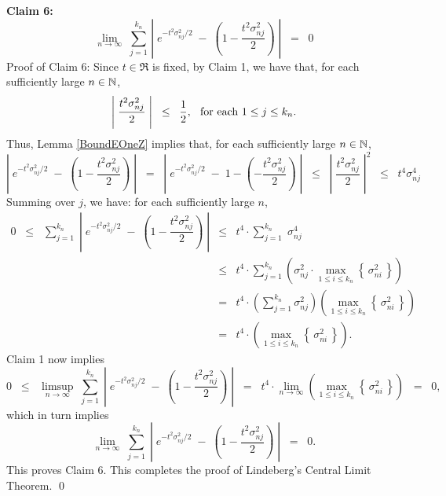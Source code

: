 \vskip 0.5cm
\noindent
\textbf{Claim 6:}
\begin{equation*}
\lim_{n\rightarrow\infty}\;
\sum_{j=1}^{k_{n}}\,
\left\vert\; e^{-t^{2}\sigma^{2}_{nj}/2} \; - \; \left(1 - \dfrac{t^{2}\sigma^{2}_{nj}}{2}\right)\;\right\vert
\;\;=\;\; 0
\end{equation*}
{\small Proof of Claim 6:
Since $t \in \Re$ is fixed, by Claim 1, we have that, for each sufficiently large $n \in \mathbb{N}$,
\begin{equation*}
\left\vert\;\dfrac{t^{2}\sigma^{2}_{nj}}{2}\;\right\vert \;\; \leq \;\; \dfrac{1}{2},
\;\;\,
\textnormal{for each $1 \leq j \leq k_{n}$}.
\end{equation*}
Thus, Lemma \ref{BoundEOneZ} implies that, for each sufficiently large $n \in \mathbb{N}$,
\begin{equation*}
\left\vert\; e^{-t^{2}\sigma^{2}_{nj}/2} \; - \; \left(1 - \dfrac{t^{2}\sigma^{2}_{nj}}{2}\right)\;\right\vert
\;\; = \;\; \left\vert\; e^{-t^{2}\sigma^{2}_{nj}/2} \; - \; 1 - \left( - \dfrac{t^{2}\sigma^{2}_{nj}}{2}\right)\;\right\vert
\;\; \leq \;\; \left\vert\; \dfrac{t^{2}\sigma^{2}_{nj}}{2} \;\right\vert^{2}
\;\; \leq \;\; t^{4}\sigma^{4}_{nj}
\end{equation*}
Summing over $j$, we have: for each sufficiently large $n$,
\begin{eqnarray*}
0 \;\; \leq \;\;
\sum_{j=1}^{k_{n}}\;\left\vert\; e^{-t^{2}\sigma^{2}_{nj}/2} \; - \; \left(1 - \dfrac{t^{2}\sigma^{2}_{nj}}{2}\right)\;\right\vert
&\leq& t^{4}\cdot\sum_{j=1}^{k_{n}}\;\sigma^{4}_{nj}
\\
&\leq& t^{4}\cdot\sum_{j=1}^{k_{n}}\left(\sigma^{2}_{nj}\cdot\max_{1\leq i \leq k_{n}}\left\{\,\sigma^{2}_{ni}\,\right\}\right)
\\
&=& t^{4}\cdot\left(\sum_{j=1}^{k_{n}}\sigma^{2}_{nj}\right)\left(\max_{1\leq i \leq k_{n}}\left\{\,\sigma^{2}_{ni}\,\right\}\right)
\\
&=& t^{4}\cdot\left(\max_{1\leq i \leq k_{n}}\left\{\,\sigma^{2}_{ni}\,\right\}\right).
\end{eqnarray*}
Claim 1 now implies
\begin{equation*}
0 \;\; \leq \;\;
\limsup_{n\rightarrow\infty}\;
\sum_{j=1}^{k_{n}}\;\left\vert\; e^{-t^{2}\sigma^{2}_{nj}/2} \; - \; \left(1 - \dfrac{t^{2}\sigma^{2}_{nj}}{2}\right)\;\right\vert
\;\;=\;\; t^{4}\cdot\lim_{n\rightarrow\infty}\left(\max_{1\leq i \leq k_{n}}\left\{\,\sigma^{2}_{ni}\,\right\}\right)
\;\; = \;\; 0,
\end{equation*}
which in turn implies
\begin{equation*}
\lim_{n\rightarrow\infty}\;
\sum_{j=1}^{k_{n}}\;\left\vert\; e^{-t^{2}\sigma^{2}_{nj}/2} \; - \; \left(1 - \dfrac{t^{2}\sigma^{2}_{nj}}{2}\right)\;\right\vert
\;\; = \;\; 0.
\end{equation*}
This proves Claim 6.
}
This completes the proof of Lindeberg's Central Limit Theorem.
\qed

